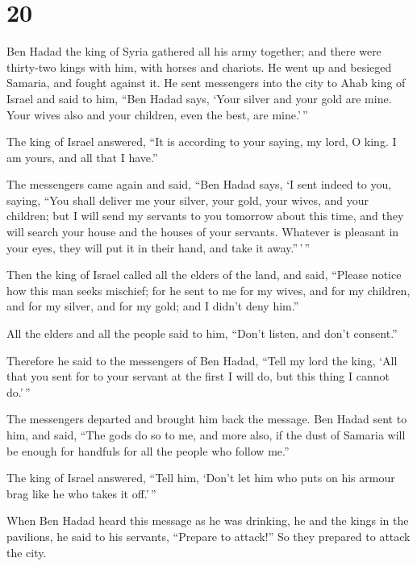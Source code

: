 \hypertarget{section-19}{%
\section{20}\label{section-19}}

 Ben Hadad the king of Syria gathered all his army
together; and there were thirty-two kings with him, with horses and
chariots. He went up and besieged Samaria, and fought against it.
 He sent messengers into the city to Ahab king of Israel
and said to him, ``Ben Hadad says,  `Your silver and your
gold are mine. Your wives also and your children, even the best, are
mine.'\,''

 The king of Israel answered, ``It is according to your
saying, my lord, O king. I am yours, and all that I have.''

 The messengers came again and said, ``Ben Hadad says, `I
sent indeed to you, saying, ``You shall deliver me your silver, your
gold, your wives, and your children;  but I will send my
servants to you tomorrow about this time, and they will search your
house and the houses of your servants. Whatever is pleasant in your
eyes, they will put it in their hand, and take it away.''\,'\,''

 Then the king of Israel called all the elders of the
land, and said, ``Please notice how this man seeks mischief; for he sent
to me for my wives, and for my children, and for my silver, and for my
gold; and I didn't deny him.''

 All the elders and all the people said to him, ``Don't
listen, and don't consent.''

 Therefore he said to the messengers of Ben Hadad, ``Tell
my lord the king, `All that you sent for to your servant at the first I
will do, but this thing I cannot do.'\,''

The messengers departed and brought him back the message.
 Ben Hadad sent to him, and said, ``The gods do so to me,
and more also, if the dust of Samaria will be enough for handfuls for
all the people who follow me.''

 The king of Israel answered, ``Tell him, `Don't let him
who puts on his armour brag like he who takes it off.'\,''

 When Ben Hadad heard this message as he was drinking, he
and the kings in the pavilions, he said to his servants, ``Prepare to
attack!'' So they prepared to attack the city.

